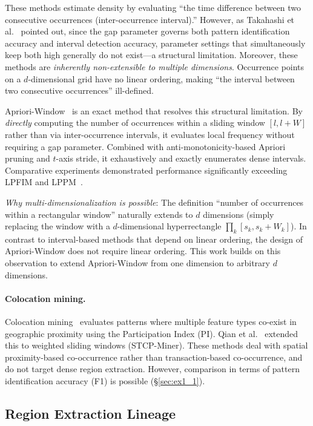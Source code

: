 These methods estimate density by evaluating
``the time difference between two consecutive occurrences
(inter-occurrence interval).''
However, as Takahashi et al.~\cite{aprioriwindow} pointed out,
since the gap parameter governs both pattern identification accuracy
and interval detection accuracy,
parameter settings that simultaneously keep both high
generally do not exist---a structural limitation.
Moreover, these methods are \emph{inherently non-extensible to
multiple dimensions}.
Occurrence points on a $d$-dimensional grid
have no linear ordering,
making ``the interval between two consecutive occurrences''
ill-defined.

Apriori-Window~\cite{aprioriwindow} is an exact method
that resolves this structural limitation.
By \emph{directly} computing the number of occurrences
within a sliding window $[l, l+W]$
rather than via inter-occurrence intervals,
it evaluates local frequency without requiring a gap parameter.
Combined with anti-monotonicity-based Apriori pruning
and $t$-axis stride, it exhaustively and exactly
enumerates dense intervals.
Comparative experiments demonstrated performance
significantly exceeding LPFIM and LPPM~\cite{aprioriwindow}.

\emph{Why multi-dimensionalization is possible}:
The definition ``number of occurrences within a rectangular window''
naturally extends to $d$ dimensions
(simply replacing the window with a $d$-dimensional hyperrectangle
$\prod_k [s_k, s_k+W_k]$).
In contrast to interval-based methods
that depend on linear ordering,
the design of Apriori-Window does not require linear ordering.
This work builds on this observation to extend
Apriori-Window from one dimension to arbitrary $d$ dimensions.

\paragraph{Colocation mining.}
Colocation mining~\cite{shekhar2001colocation}
evaluates patterns where multiple feature types
co-exist in geographic proximity
using the Participation Index (PI).
Qian et al.~\cite{qian2009stcolocation} extended this
to weighted sliding windows (STCP-Miner).
These methods deal with spatial proximity-based co-occurrence
rather than transaction-based co-occurrence,
and do not target dense region extraction.
However, comparison in terms of
pattern identification accuracy (F1)
is possible (\S\ref{sec:ex1_1}).

\subsection{Region Extraction Lineage}

